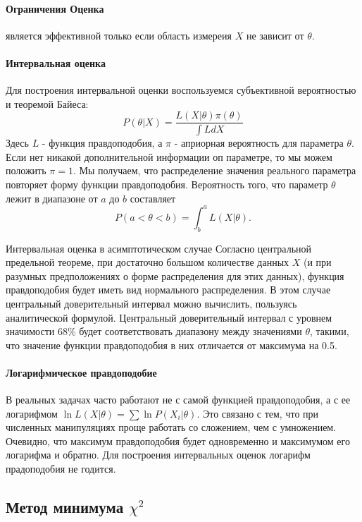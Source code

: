 \paragraph{Ограничения Оценка}
является эффективной только если область измереия $X$ не зависит от
$\theta$. 

\paragraph{Интервальная оценка} Для построения интервальной
оценки воспользуемся субъективной вероятностью и теоремой Байеса:
\begin{equation}
  P(\theta | X) = \frac{L(X|\theta) \pi(\theta)}{\int{LdX}}
\end{equation} Здесь $L$ - функция правдоподобия, а $\pi$ -
априорная вероятность для параметра $\theta$. Если нет никакой
дополнительной информации оп параметре, то мы можем положить
$\pi = 1$. Мы получаем, что распределение значения реального параметра
повторяет форму функции правдоподобия. Вероятность того, что параметр
$\theta$ лежит в диапазоне от $a$ до $b$ составляет
\begin{equation}
  P(a < \theta < b) = \int_b^a{L(X | \theta)}.
\end{equation} 

Интервальная оценка в асимптотическом случае
Согласно центральной предельной теореме, при достаточно большом
количестве данных $X$ (и при разумных предположениях о форме
распределения для этих данных), функция правдоподобия будет иметь вид
нормального распределения. В этом случае центральный доверительный
интервал можно вычислить, пользуясь аналитической формулой. Центральный
доверительный интервал с уровнем значимости 68\% будет соответствовать
диапазону между значениями $\theta$, такими, что значение функции
правдоподобия в них отличается от максимума на 0.5.

\paragraph{Логарифмическое правдоподобие}
В реальных задачах часто работают не с
самой функцией правдоподобия, а с ее логарифмом
$\ln L(X|\theta) = \sum{\ln P(X_i | \theta)}$. Это связано с тем, что
при численных манипуляциях проще работать со сложением, чем с
умножением. Очевидно, что максимум правдоподобия будет одновременно и
максимумом его логарифма и обратно. Для построения интервальных оценок
логарифм прадоподобия не годится.


\subsection{Метод минимума \texorpdfstring{$\chi^{2}$}{chi2}}
\label{sec:chi2}

